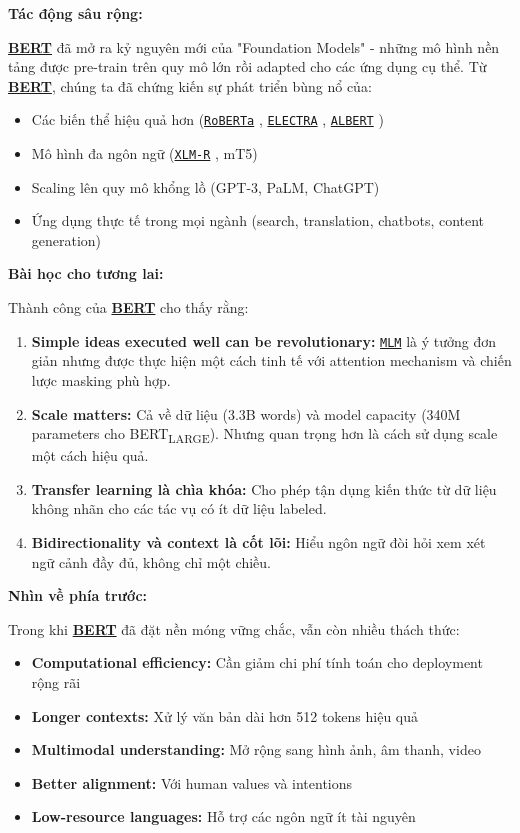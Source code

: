 \textbf{Tác động sâu rộng:}

\hyperref[acro:bert]{\textbf{BERT}} đã mở ra kỷ nguyên mới của "Foundation Models" - những mô hình nền tảng được pre-train trên quy mô lớn rồi adapted cho các ứng dụng cụ thể. Từ \hyperref[acro:bert]{\textbf{BERT}}, chúng ta đã chứng kiến sự phát triển bùng nổ của:

\begin{itemize}
    \item Các biến thể hiệu quả hơn (\hyperref[acro:roberta]{\texttt{RoBERTa}} \cite{liu2019roberta}, \hyperref[acro:electra]{\texttt{ELECTRA}} \cite{clark2020electra}, \hyperref[acro:albert]{\texttt{ALBERT}} \cite{lan2019albert})
    \item Mô hình đa ngôn ngữ (\hyperref[acro:xlm-r]{\texttt{XLM-R}} \cite{conneau2019unsupervised}, mT5)
    \item Scaling lên quy mô khổng lồ (GPT-3, PaLM, ChatGPT)
    \item Ứng dụng thực tế trong mọi ngành (search, translation, chatbots, content generation)
\end{itemize}

\textbf{Bài học cho tương lai:}

Thành công của \hyperref[acro:bert]{\textbf{BERT}} cho thấy rằng:
\begin{enumerate}
    \item \textbf{Simple ideas executed well can be revolutionary:} \hyperref[acro:mlm]{\texttt{MLM}} là ý tưởng đơn giản nhưng được thực hiện một cách tinh tế với attention mechanism và chiến lược masking phù hợp.
    
    \item \textbf{Scale matters:} Cả về dữ liệu (3.3B words) và model capacity (340M parameters cho BERT\textsubscript{LARGE}). Nhưng quan trọng hơn là cách sử dụng scale một cách hiệu quả.
    
    \item \textbf{Transfer learning là chìa khóa:} Cho phép tận dụng kiến thức từ dữ liệu không nhãn cho các tác vụ có ít dữ liệu labeled.
    
    \item \textbf{Bidirectionality và context là cốt lõi:} Hiểu ngôn ngữ đòi hỏi xem xét ngữ cảnh đầy đủ, không chỉ một chiều.
\end{enumerate}

\textbf{Nhìn về phía trước:}

Trong khi \hyperref[acro:bert]{\textbf{BERT}} đã đặt nền móng vững chắc, vẫn còn nhiều thách thức:
\begin{itemize}
    \item \textbf{Computational efficiency:} Cần giảm chi phí tính toán cho deployment rộng rãi
    \item \textbf{Longer contexts:} Xử lý văn bản dài hơn 512 tokens hiệu quả
    \item \textbf{Multimodal understanding:} Mở rộng sang hình ảnh, âm thanh, video
    \item \textbf{Better alignment:} Với human values và intentions
    \item \textbf{Low-resource languages:} Hỗ trợ các ngôn ngữ ít tài nguyên
\end{itemize}


